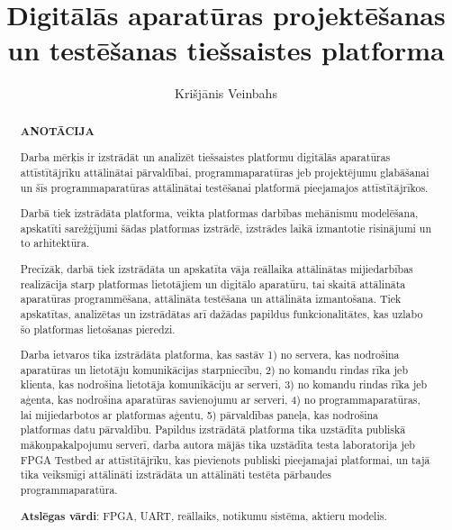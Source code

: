 \documentclass{LU}
\title{Digitālās aparatūras projektēšanas un testēšanas tiešsaistes platforma}
\author{Krišjānis Veinbahs}
\begin{document}
\maketitle

\renewcommand{\abstractname}{}
\begin{abstract}
    \begin{center}
    \Large\textbf{ANOTĀCIJA}\\
    \end{center}
    \vspace{1.5\baselineskip}

    Darba mērķis ir izstrādāt un analizēt tiešsaistes platformu digitālās
    aparatūras attīstītājrīku attālinātai pārvaldībai, programmaparatūras jeb
    projektējumu glabāšanai un šīs programmaparatūras attālinātai testēšanai
    platformā pieejamajos attīstītājrīkos.

    Darbā tiek izstrādāta platforma, veikta platformas darbības mehānismu
    modelēšana, apskatīti sarežģījumi šādas platformas izstrādē, izstrādes laikā
    izmantotie risinājumi un to arhitektūra.

    Precīzāk, darbā tiek izstrādāta un apskatīta vāja reāllaika attālinātas
    mijiedarbības realizācija starp platformas lietotājiem un digitālo
    aparatūru, tai skaitā attālināta aparatūras programmēšana, attālināta
    testēšana un attālināta izmantošana. Tiek apskatītas, analizētas un
    izstrādātas arī dažādas papildus funkcionalitātes, kas uzlabo šo platformas
    lietošanas pieredzi.

    Darba ietvaros tika izstrādāta platforma, kas sastāv 1) no servera, kas
    nodrošina aparatūras un lietotāju komunikācijas starpniecību, 2) no komandu
    rindas rīka jeb klienta, kas nodrošina lietotāja komunikāciju ar serveri, 3)
    no komandu rindas rīka jeb aģenta, kas nodrošina aparatūras savienojumu ar
    serveri, 4) no programmaparatūras, lai mijiedarbotos ar platformas aģentu,
    5) pārvaldības paneļa, kas nodrošina platformas datu pārvaldību. Papildus
    izstrādātā platforma tika uzstādīta publiskā mākoņpakalpojumu serverī, darba
    autora mājās tika uzstādīta testa laboratorija jeb FPGA Testbed ar
    attīstītājrīku, kas pievienots publiski pieejamajai platformai, un tajā tika
    veiksmīgi attālināti izstrādāta un attālināti testēta pārbaudes
    programmaparatūra.

    \textbf{Atslēgas vārdi}: FPGA, UART, reāllaiks, notikumu sistēma, aktieru modelis.
\end{abstract}
 
\end{document}
